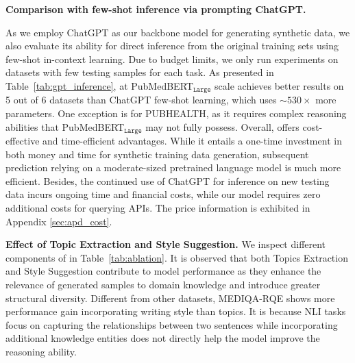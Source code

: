 \textbf{Comparison with few-shot inference via prompting ChatGPT.}

As we employ ChatGPT as our backbone model for generating synthetic data, we also evaluate its ability for direct inference from the original training sets using few-shot in-context learning. Due to budget limits, we only run experiments on datasets with few testing samples for each task.  
As presented in Table~\ref{tab:gpt_inference}, {\ours} at PubMedBERT$_{\texttt{Large}}$ scale achieves better results on 5 out of 6 datasets than ChatGPT few-shot learning, which uses $\sim 530 \times$ more parameters. 
One exception is for PUBHEALTH, as it requires complex reasoning abilities that PubMedBERT$_{\texttt{Large}}$ may not fully possess. 
Overall, {\ours} offers cost-effective and time-efficient advantages. 
While it entails a one-time investment in both money and time for synthetic training data generation, subsequent prediction relying on a moderate-sized pretrained language model is much more efficient. 
Besides, the continued use of ChatGPT for inference on new testing data 
incurs ongoing time and financial costs, while our model requires zero additional costs for querying APIs. The price information is exhibited in Appendix \ref{sec:apd_cost}.

\textbf{Effect of Topic Extraction and Style Suggestion.}
We inspect different components of {\ours} in Table~\ref{tab:ablation}. It is observed that both Topics Extraction and Style Suggestion contribute to model performance as they enhance the relevance of generated samples to domain knowledge and introduce greater structural diversity. Different from other datasets, MEDIQA-RQE shows more performance gain incorporating writing style than topics. It is because NLI tasks focus on capturing the relationships between two sentences while incorporating additional knowledge entities does not directly help the model improve the reasoning ability.



